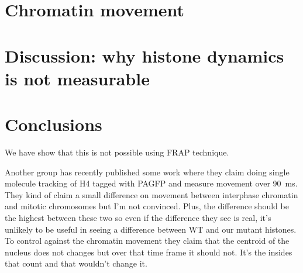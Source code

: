 \section{Chromatin movement}




\section{Discussion: why histone dynamics is not measurable}


\section{Conclusions}
  We have show that this is not possible using FRAP technique.
  
  Another group has recently
  published some work where they claim doing single molecule tracking of H4 tagged with PAGFP
  and measure movement over \SI{90}{\ms}. They kind of claim
  a small difference on movement between interphase chromatin and mitotic chromosomes but
  I'm not convinced. Plus, the difference should be the highest between these two so even if
  the difference they see is real, it's unlikely to be useful in seeing a difference between
  WT and our mutant histones. To control against the chromatin movement they claim that the
  centroid of the nucleus does not changes but over that time frame it should not. It's the
  insides that count and that wouldn't change it.
  


